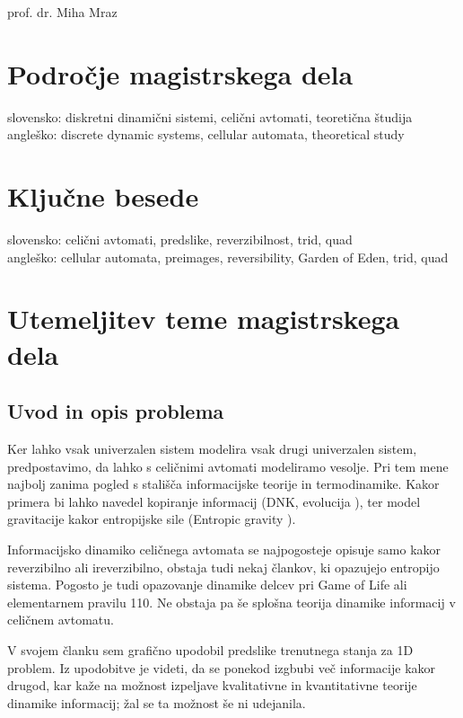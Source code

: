 \documentclass[a4paper, 12pt]{article}
\begin{document}
\bigskip
prof. dr. Miha Mraz



\clearpage

\section{Področje magistrskega dela}

slovensko: diskretni dinamični sistemi, celični avtomati, teoretična študija \\
angleško: discrete dynamic systems, cellular automata, theoretical study


\section{Ključne besede}

slovensko: celični avtomati, predslike, reverzibilnost, trid, quad   \\
angleško: cellular automata, preimages, reversibility, Garden of Eden,  trid, quad


\section{Utemeljitev teme magistrskega dela}

\subsection{Uvod in opis problema}

Ker lahko vsak univerzalen sistem modelira vsak drugi univerzalen sistem, predpostavimo,
da lahko s celičnimi avtomati modeliramo vesolje. Pri tem mene najbolj zanima pogled s
stališča informacijske teorije in termodinamike. Kakor primera bi lahko navedel kopiranje informacij
(DNK, evolucija \cite{Salzberg2004}), ter model gravitacije kakor entropijske sile (Entropic gravity \cite{Verlinde2010}).

Informacijsko dinamiko celičnega avtomata se najpogosteje opisuje samo kakor reverzibilno ali ireverzibilno,
obstaja tudi nekaj člankov, ki opazujejo entropijo sistema.
Pogosto je tudi opazovanje dinamike delcev pri Game of Life ali elementarnem pravilu 110.
Ne obstaja pa še splošna teorija dinamike informacij v celičnem avtomatu.

V svojem članku \cite{JerasDobnikar2007} sem grafično upodobil predslike trenutnega stanja za 1D problem.
Iz upodobitve je videti, da se ponekod izgbubi več informacije kakor drugod,
kar kaže na možnost izpeljave kvalitativne in kvantitativne teorije dinamike informacij;
žal se ta možnost še ni udejanila.
\end{document}
